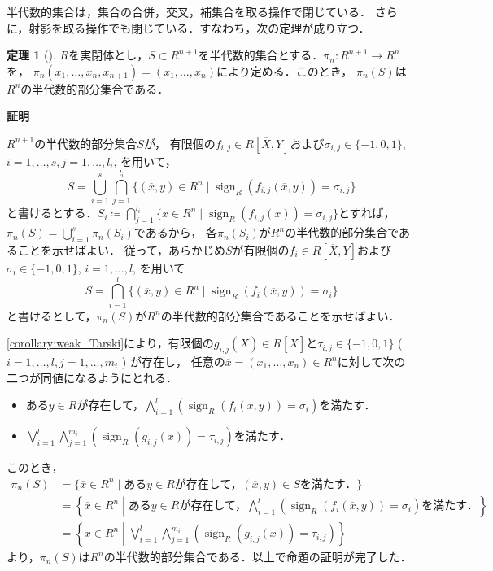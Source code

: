 \documentclass[uplatex, dvipdfmx]{jsarticle}
\makeatletter
\numberwithin{equation}{section}
\renewenvironment{proof}[1][\proofname]{\par
  \pushQED{\qed}%
  \normalfont \topsep6\p@\@plus6\p@\relax
  \trivlist
  \item\relax
  {\bfseries
  #1\@addpunct{.}}\hspace\labelsep\ignorespaces
}{
  \popQED\endtrivlist\@endpefalse
}
\newcommand{\map}[3]{{#1}\colon{#2}\rightarrow{#3}}
\DeclareMathOperator{\sign}{sign}
\theoremstyle{definition}
\newtheorem{theorem}[definition]{定理}
\renewcommand{\proofname}{\textbf{証明}}
\makeatother
\begin{document}
半代数的集合は，集合の合併，交叉，補集合を取る操作で閉じている．
さらに，射影を取る操作でも閉じている．すなわち，次の定理が成り立つ．

\begin{theorem}[{\cite[Theorem 2.2.1.]{MR1659509}}]\label{theorem:Tarski-Seidenberg}
     $R$を実閉体とし，$S \subset R^{n+1}$を半代数的集合とする．$\map{\pi_{n}}{R^{n+1}}{R^n}$を，
     $\pi_{n}(x_1, \dots, x_n, x_{n+1}) = (x_1, \dots, x_n)$により定める．このとき，
     $\pi_{n}(S)$は$R^n$の半代数的部分集合である．
\end{theorem}

\begin{proof}
     $R^{n+1}$の半代数的部分集合$S$が，
     有限個の$f_{i,j} \in R\left[\overline{X}, Y\right]$および$\sigma_{i,j} \in \{-1, 0 ,1\}$, $i=1, \dots, s, j = 1, \dots, l_i$, を用いて，
     \begin{equation}
          S = \bigcup_{i=1}^s \bigcap_{j=1}^{l_i} \{(\overline{x},y) \in R^n \mid \sign_R(f_{i,j}(\overline{x},y)) = \sigma_{i,j}\}
     \end{equation}
     と書けるとする．$S_i \coloneqq \bigcap_{j=1}^{l_i} \{\overline{x} \in R^n \mid \sign_R(f_{i,j}(\overline{x})) = \sigma_{i,j}\}$とすれば，
     $\pi_n(S) = \bigcup_{i=1}^s \pi_n(S_i)$であるから，
     各$\pi_n(S_i)$が$R^n$の半代数的部分集合であることを示せばよい．
     従って，あらかじめ$S$が有限個の$f_i \in R[\overline{X}, Y]$および$\sigma_i \in \{-1, 0, 1\}$, $i=1, \dots, l$, を用いて
     \begin{equation}
          S = \bigcap_{i=1}^{l} \{(\overline{x},y) \in R^n \mid \sign_R(f_i(\overline{x},y)) = \sigma_i\}
     \end{equation}
     と書けるとして，$\pi_n(S)$が$R^n$の半代数的部分集合であることを示せばよい．
     
     \cref{corollary:weak_Tarski}により，有限個の$g_{i,j}(\overline{X}) \in R[\overline{X}]$と$\tau_{i,j} \in \{-1, 0, 1\}$ ( $i=1, \dots, l, j=1, \dots, m_i$ ) が存在し，
     任意の$\overline{x} = (x_1, \dots, x_n) \in R^n$に対して次の二つが同値になるようにとれる．
     \begin{itemize}
          \item ある$y \in R$が存在して，$\bigwedge_{i=1}^l (\sign_R(f_i(\overline{x}, y)) = \sigma_i)$を満たす．
          \item $\bigvee_{i=1}^l \bigwedge_{j=1}^{m_i}(\sign_R(g_{i,j}(\overline{x})) = \tau_{i,j})$を満たす．
     \end{itemize}
     このとき，
     \begin{align}
          \pi_n(S) 
          &= \{\overline{x} \in R^n \mid \text{ある$y \in R$が存在して，$(\overline{x}, y) \in S$を満たす．}\}\\
          &= \left\{\overline{x} \in R^n \middle| \text{ある$y \in R$が存在して，$\bigwedge_{i=1}^l (\sign_R(f_i(\overline{x}, y)) = \sigma_i)$を満たす．}\right\}\\
          &= \left\{\overline{x} \in R^n \middle| \bigvee_{i=1}^l \bigwedge_{j=1}^{m_i}(\sign_R(g_{i,j}(\overline{x})) = \tau_{i,j})\right\}
     \end{align}
     より，$\pi_n(S)$は$R^n$の半代数的部分集合である．以上で命題の証明が完了した．
\end{proof}
\end{document}
